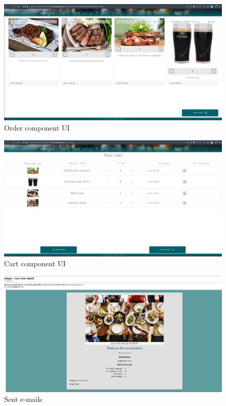 \begin{figure}[ht]
	\centering
	\includegraphics[width=150mm, keepaspectratio]{figures/UI/5_Order.png}
	\caption{Order component UI} 
	\label{fig:UI_5}
\end{figure}

\begin{figure}[ht]
\centering
\includegraphics[width=150mm, keepaspectratio]{figures/UI/3_Cart.png}
\caption{Cart component UI} 
\label{fig:UI_3}
\end{figure}

\begin{figure}[ht]
	\centering
	\includegraphics[width=150mm, keepaspectratio]{figures/UI/7_Email_1.png}
	\caption{Sent e-mails} 
	\label{fig:UI_6}
\end{figure}

